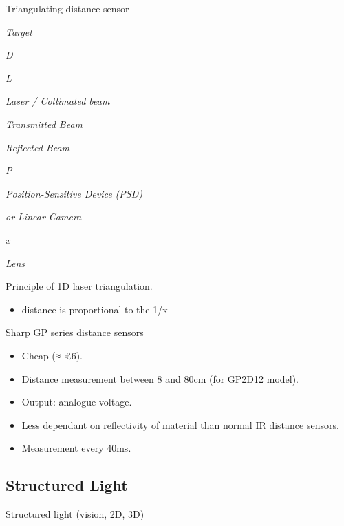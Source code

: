 \documentclass[compress]{beamer}
\begin{document}
\begin{frame}{Triangulating distance sensor}

\emph{Target}

\emph{D}

\emph{L}

\emph{Laser / Collimated beam}

\emph{Transmitted Beam}

\emph{Reflected Beam}

\emph{P}

\emph{Position-Sensitive Device (PSD)}

\emph{or Linear Camera}

\emph{x}

\emph{Lens}

Principle of 1D laser triangulation.

\begin{itemize}

\item
  distance is proportional to the 1/x
\end{itemize}

\end{frame}

\begin{frame}{Sharp GP series distance sensors}

\begin{itemize}

\item
  Cheap (≈ £6).
\item
  Distance measurement between 8 and 80cm (for GP2D12 model).
\item
  Output: analogue voltage.
\item
  Less dependant on reflectivity of material than normal IR distance
  sensors.
\item
  Measurement every 40ms.
\end{itemize}

\end{frame}

\subsection{Structured Light}


\begin{frame}{Structured light (vision, 2D, 3D)}
\end{frame}
\end{document}
